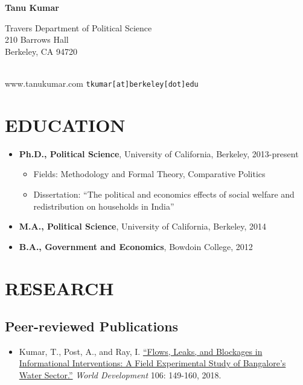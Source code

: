 \documentclass[11pt]{article}
\begin{document}
\begin{center}
\textbf{\Huge{Tanu Kumar}}
\end{center}

\begin{minipage}[t]{0.5\textwidth}
Travers Department of Political Science\\
210 Barrows Hall\\
Berkeley, CA 94720\\ \\
\end{minipage}
\begin{minipage}[t]{0.5\textwidth}
\begin{flushright}
www.tanukumar.com
\texttt{tkumar[at]berkeley[dot]edu}
\end{flushright}\end{minipage}
\section*{EDUCATION}

	\begin{itemize}[nosep]
		\item[] \textbf{Ph.D., Political Science}, University of California, Berkeley, 2013-present
		\begin{itemize}[nosep]
	\item[] Fields: Methodology and Formal Theory, Comparative Politics
	\item[] Dissertation: ``The political and economics effects of social welfare and redistribution on households in India''
\end{itemize}
	\item[]  \textbf{M.A., Political Science}, University of California, Berkeley, 2014
	\item[] \textbf{B.A., Government and Economics}, Bowdoin College, 2012

\end{itemize}	

\section*{RESEARCH}

\subsection*{Peer-reviewed Publications}
\begin{itemize}
		\item[] Kumar, T., Post, A., and Ray, I. \href{https://www.sciencedirect.com/science/article/pii/S0305750X18300329}{``Flows, Leaks, and Blockages in Informational Interventions: A Field Experimental Study of Bangalore's Water Sector.''} \textit{World Development} 106: 149-160, 2018.
\end{itemize}
\end{document}
